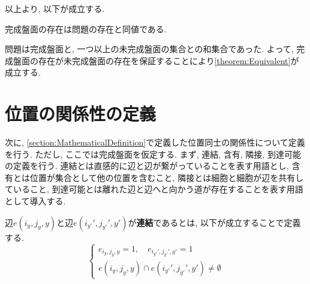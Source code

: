 以上より, 以下が成立する.
\begin{theorem}\label{theorem:Equivalent}
  完成盤面の存在は問題の存在と同値である.
\end{theorem}
問題は完成盤面と, 一つ以上の未完成盤面の集合との和集合であった. よって, 完成盤面の存在が未完成盤面の存在を保証することにより\cref{theorem:Equivalent}が成立する.






\section{位置の関係性の定義}\label{section:RelationDefinition}

次に, \cref{section:MathematicalDefinition}で定義した位置同士の関係性について定義を行う. ただし, ここでは完成盤面を仮定する.
まず, 連結, 含有, 隣接, 到達可能の定義を行う.
連結とは直感的に辺と辺が繋がっていることを表す用語とし, 含有とは位置が集合として他の位置を含むこと, 隣接とは細胞と細胞が辺を共有していること, 到達可能とは離れた辺と辺へと向かう道が存在することを表す用語として導入する.

\begin{definition}[連結]\label{definition:Connection}
  辺$e(i_y,j_y,y)$と辺$e(i_{y'}',j_{y'}',y')$が\textbf{連結}であるとは, 以下が成立することで定義する.
  \begin{equation}
    \begin{cases}
      {e_{i_y,j_y,y}=1,\quad e_{i_{y'}',j_{y'}',y'}  =     1          } \\
      {e(i_y,j_y,y)\cap e(i_{y'}',j_{y'}',y')  \neq  \emptyset}
    \end{cases}
  \end{equation}
\end{definition}

